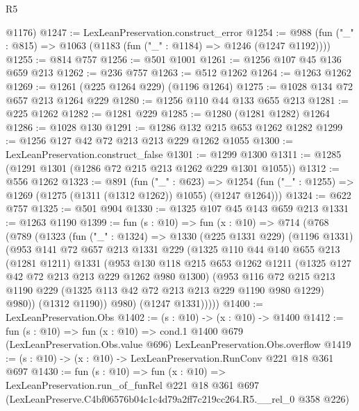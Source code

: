 \begin{lexlean}{R5}
\begin{coremodule}
      @1176)
@1247 := LexLeanPreservation.construct_error
@1254 := @988 (fun ("_" : @815) => @1063 (@1183 (fun ("_" : @1184) => @1246 (@1247 @1192))))
@1255 := @814 @757
@1256 := @501 @1001
@1261 := @1256 @107 @45 @136 @659 @213
@1262 := @236 @757
@1263 := @512 @1262
@1264 := @1263 @1262
@1269 := @1261 (@225 @1264 @229) (@1196 @1264)
@1275 := @1028 @134 @72 @657 @213 @1264 @229
@1280 := @1256 @110 @44 @133 @655 @213
@1281 := @225 @1262
@1282 := @1281 @229
@1285 := @1280 (@1281 @1282) @1264
@1286 := @1028 @130
@1291 := @1286 @132 @215 @653 @1262 @1282
@1299 := @1256 @127 @42 @72 @213 @213 @229 @1262 @1055
@1300 := LexLeanPreservation.construct_false
@1301 := @1299 @1300
@1311 := @1285 (@1291 @1301 (@1286 @72 @215 @213 @1262 @229 @1301 @1055))
@1312 := @556 @1262
@1323 := @891
    (fun ("_" : @623) =>
    @1254 (fun ("_" : @1255) => @1269 (@1275 (@1311 (@1312 @1262)) @1055) (@1247 @1264)))
@1324 := @622 @757
@1325 := @501 @904
@1330 := @1325 @107 @45 @143 @659 @213
@1331 := @1263 @1190
@1399 := fun (s : @10) =>
  fun (x : @10) =>
  @714
    (@768
      (@789
        (@1323
          (fun ("_" : @1324) =>
          @1330
            (@225 @1331 @229)
            (@1196 @1331)
            (@953
              @141
              @72
              @657
              @213
              @1331
              @229
              (@1325
                @110
                @44
                @140
                @655
                @213
                (@1281 @1211)
                @1331
                (@953
                  @130
                  @118
                  @215
                  @653
                  @1262
                  @1211
                  (@1325 @127 @42 @72 @213 @213 @229 @1262 @980 @1300)
                  (@953
                    @116
                    @72
                    @215
                    @213
                    @1190
                    @229
                    (@1325 @113 @42 @72 @213 @213 @229 @1190 @980 @1229)
                    @980))
                (@1312 @1190))
              @980)
            (@1247 @1331)))))
@1400 := LexLeanPreservation.Obs
@1402 := (s : @10) -> (x : @10) -> @1400
@1412 := fun (s : @10) =>
  fun (x : @10) =>
  cond.{1} @1400 @679 (LexLeanPreservation.Obs.value @696) LexLeanPreservation.Obs.overflow
@1419 := (s : @10) -> (x : @10) -> LexLeanPreservation.RunConv @221 @18 @361 @697
@1430 := fun (s : @10) =>
  fun (x : @10) =>
  LexLeanPreservation.run_of_funRel
    @221
    @18
    @361
    @697
    (LexLeanPreserve.C4bf06576b04c1c4d79a2ff7c219cc264.R5.__rel_0 @358 @226)
\end{coremodule}
\end{lexlean}
